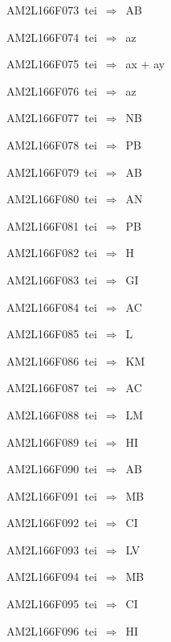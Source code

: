 {\sixrm AM2L166F073\ {\sixit tei}\ }$\Rightarrow$\ AB\par\smallskip
{\sixrm AM2L166F074\ {\sixit tei}\ }$\Rightarrow$\ {\tenit az}\par\smallskip
{\sixrm AM2L166F075\ {\sixit tei}\ }$\Rightarrow$\ {\tenit ax} + {\tenit ay}\par\smallskip
{\sixrm AM2L166F076\ {\sixit tei}\ }$\Rightarrow$\ {\tenit az}\par\smallskip
{\sixrm AM2L166F077\ {\sixit tei}\ }$\Rightarrow$\ NB\par\smallskip
{\sixrm AM2L166F078\ {\sixit tei}\ }$\Rightarrow$\ PB\par\smallskip
{\sixrm AM2L166F079\ {\sixit tei}\ }$\Rightarrow$\ AB\par\smallskip
{\sixrm AM2L166F080\ {\sixit tei}\ }$\Rightarrow$\ AN\par\smallskip
{\sixrm AM2L166F081\ {\sixit tei}\ }$\Rightarrow$\ PB\par\smallskip
{\sixrm AM2L166F082\ {\sixit tei}\ }$\Rightarrow$\ H\par\smallskip
{\sixrm AM2L166F083\ {\sixit tei}\ }$\Rightarrow$\ GI\par\smallskip
{\sixrm AM2L166F084\ {\sixit tei}\ }$\Rightarrow$\ AC\par\smallskip
{\sixrm AM2L166F085\ {\sixit tei}\ }$\Rightarrow$\ L\par\smallskip
{\sixrm AM2L166F086\ {\sixit tei}\ }$\Rightarrow$\ KM\par\smallskip
{\sixrm AM2L166F087\ {\sixit tei}\ }$\Rightarrow$\ AC\par\smallskip
{\sixrm AM2L166F088\ {\sixit tei}\ }$\Rightarrow$\ LM\par\smallskip
{\sixrm AM2L166F089\ {\sixit tei}\ }$\Rightarrow$\ HI\par\smallskip
{\sixrm AM2L166F090\ {\sixit tei}\ }$\Rightarrow$\ AB\par\smallskip
{\sixrm AM2L166F091\ {\sixit tei}\ }$\Rightarrow$\ MB\par\smallskip
{\sixrm AM2L166F092\ {\sixit tei}\ }$\Rightarrow$\ CI\par\smallskip
{\sixrm AM2L166F093\ {\sixit tei}\ }$\Rightarrow$\ LV\par\smallskip
{\sixrm AM2L166F094\ {\sixit tei}\ }$\Rightarrow$\ MB\par\smallskip
{\sixrm AM2L166F095\ {\sixit tei}\ }$\Rightarrow$\ CI\par\smallskip
{\sixrm AM2L166F096\ {\sixit tei}\ }$\Rightarrow$\ HI\par\smallskip

